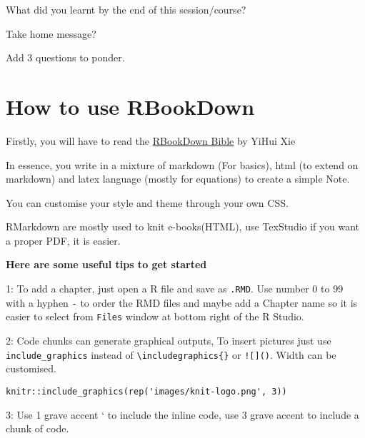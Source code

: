 \documentclass[
]{book}
\begin{document}
What did you learnt by the end of this session/course?

Take home message?

Add 3 questions to ponder.

\hypertarget{how-to-use-rbookdown}{%
\chapter*{How to use RBookDown}\label{how-to-use-rbookdown}}

Firstly, you will have to read the \href{https://bookdown.org/yihui/bookdown/}{RBookDown Bible} by YiHui Xie

In essence, you write in a mixture of markdown (For basics), html (to extend on markdown) and latex language (mostly for equations) to create a simple Note.

You can customise your style and theme through your own CSS.

RMarkdown are mostly used to knit e-books(HTML), use TexStudio if you want a proper PDF, it is easier.

\textbf{Here are some useful tips to get started}

1: To add a chapter, just open a R file and save as \texttt{.RMD}. Use number 0 to 99 with a hyphen \texttt{-} to order the RMD files and maybe add a Chapter name so it is easier to select from \texttt{Files} window at bottom right of the R Studio.

2: Code chunks can generate graphical outputs, To insert pictures just use \texttt{include\_graphics} instead of \texttt{\textbackslash{}includegraphics\{\}} or \texttt{!{[}{]}()}. Width can be customised.

\begin{verbatim}
knitr::include_graphics(rep('images/knit-logo.png', 3))
\end{verbatim}

3: Use 1 grave accent ` to include the inline code, use 3 grave accent to include a chunk of code.

  
\end{document}
